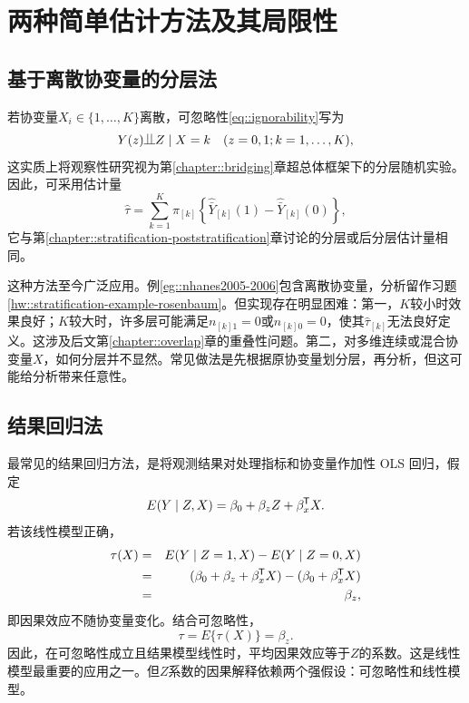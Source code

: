 \section{两种简单估计方法及其局限性}


\subsection{基于离散协变量的分层法}

若协变量$X_i \in \{1, \ldots, K \}$离散，可忽略性\eqref{eq::ignorability}写为
$$
 Y(z) \ind Z \mid X = k \quad (z=0,1; k=1,\ldots, K),
 $$
这实质上将观察性研究视为第\ref{chapter::bridging}章超总体框架下的分层随机实验。因此，可采用估计量
$$
\hat{\tau} = \sum_{k=1}^K \pi_{[k]} \left\{   \hat{\bar{Y}}_{[k]}(1) - \hat{\bar{Y}}_{[k]}(0)   \right\},
$$
它与第\ref{chapter::stratification-poststratification}章讨论的分层或后分层估计量相同。 


这种方法至今广泛应用。例\ref{eg::nhanes2005-2006}包含离散协变量，分析留作习题\ref{hw::stratification-example-rosenbaum}。但实现存在明显困难：第一，$K$较小时效果良好；$K$较大时，许多层可能满足$n_{[k]1}  = 0$或$n_{[k]0} = 0$，使其$\hat{\tau}_{[k]}$无法良好定义。这涉及后文第\ref{chapter::overlap}章的重叠性问题。第二，对多维连续或混合协变量$X$，如何分层并不显然。常见做法是先根据原协变量划分层，再分析，但这可能给分析带来任意性。 


\subsection{结果回归法}\label{sec::outcome-regression}


最常见的结果回归方法，是将观测结果对处理指标和协变量作加性 OLS 回归，假定
$$
E(Y\mid Z, X) = \beta_0 + \beta_z Z  + \beta_x ^{\mkern-1.5mu\mathsf{T}} X .
$$
若该线性模型正确，
\begin{eqnarray*}
\tau(X) &=&  E(Y\mid Z=1, X) - E(Y\mid Z=0, X) \\
&=& (\beta_0 + \beta_z   + \beta_x^{\mkern-1.5mu\mathsf{T}}  X ) - ( \beta_0    + \beta_x^{\mkern-1.5mu\mathsf{T}}  X )  \\
&=& \beta_z,
\end{eqnarray*}
即因果效应不随协变量变化。结合可忽略性，
$$
\tau = E\{ \tau(X)  \} = \beta_z.
$$
因此，在可忽略性成立且结果模型线性时，平均因果效应等于$Z$的系数。这是线性模型最重要的应用之一。但$Z$系数的因果解释依赖两个强假设：可忽略性和线性模型。 
 
 
 
